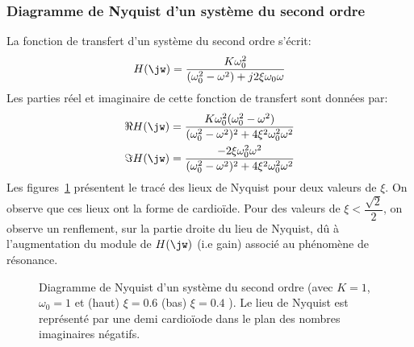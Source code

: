\subsubsection{Diagramme de Nyquist d'un système du second ordre}
La fonction de transfert d'un système du second ordre s'écrit:
\[
H(\jw)=\dfrac{K\omega_0^2}{(\omega_0^2-\omega^2)+j2\xi\omega_0\omega}
\]
Les parties réel et imaginaire de cette fonction de transfert sont données par:
\begin{align*}
    \Re{H(\jw)}&=
    \dfrac{K\omega_0^2(\omega_0^2-\omega^2)}{(\omega_0^2-\omega^2)^2
    +4\xi^2\omega_0^2\omega^2}\\
    \Im{H(\jw)}&=\dfrac{-2\xi\omega_0^2\omega^2}{(\omega_0^2-\omega^2)^2
    +4\xi^2\omega_0^2\omega^2}
\end{align*}
Les figures~\cref{fig-nyquist_2nd_1} présentent le tracé des lieux de Nyquist 
pour deux valeurs de $\xi$. On observe que ces lieux ont la forme de cardioïde.
Pour des valeurs de $\xi<\dfrac{\sqrt{2}}{2}$, on observe un renflement, sur 
la partie droite du lieu de Nyquist, dû à l'augmentation
du module de $H(\jw)$ (i.e gain) associé au phénomène de résonance.
\begin{figure}[!h]
    \centering
    

    
    \caption{Diagramme de Nyquist d'un système du second ordre 
             (avec $K=1$,$\omega_0=1$ et (haut) $\xi=0.6$ (bas) $\xi=0.4$ ). 
             Le lieu de Nyquist est représenté par 
             une demi cardio\"iode dans le plan des nombres imaginaires 
             négatifs.\label{fig-nyquist_2nd_1}}
\end{figure}
\newpage
